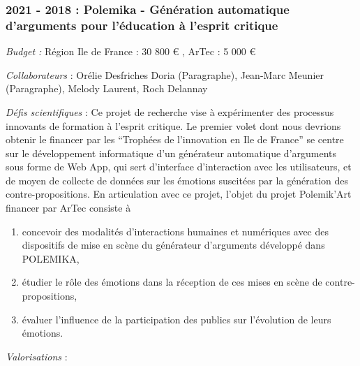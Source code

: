 \documentclass[
  a4paper,
  DIV=11,
  numbers=noendperiod]{scrreprt}
\begin{document}
\subsubsection*{2021 - 2018 : Polemika - Génération automatique
d'arguments pour l'éducation à l'esprit
critique}\label{sec-projetPolemika}

\emph{Budget :} Région Ile de France : 30 800 € , ArTec : 5 000 €

\emph{Collaborateurs} : Orélie Desfriches Doria (Paragraphe), Jean-Marc
Meunier (Paragraphe), Melody Laurent, Roch Delannay

\emph{Défis scientifiques} : Ce projet de recherche vise à expérimenter
des processus innovants de formation à l'esprit critique. Le premier
volet dont nous devrions obtenir le financer par les ``Trophées de
l'innovation en Ile de France'' se centre sur le développement
informatique d'un générateur automatique d'arguments sous forme de Web
App, qui sert d'interface d'interaction avec les utilisateurs, et de
moyen de collecte de données sur les émotions suscitées par la
génération des contre-propositions. En articulation avec ce projet,
l'objet du projet Polemik'Art financer par ArTec consiste à

\begin{enumerate}
\def\labelenumi{\arabic{enumi}.}
\item
  concevoir des modalités d'interactions humaines et numériques avec des
  dispositifs de mise en scène du générateur d'arguments développé dans
  POLEMIKA,
\item
  étudier le rôle des émotions dans la réception de ces mises en scène
  de contre-propositions,
\item
  évaluer l'influence de la participation des publics sur l'évolution de
  leurs émotions.
\end{enumerate}

\emph{Valorisations} :
\end{document}

